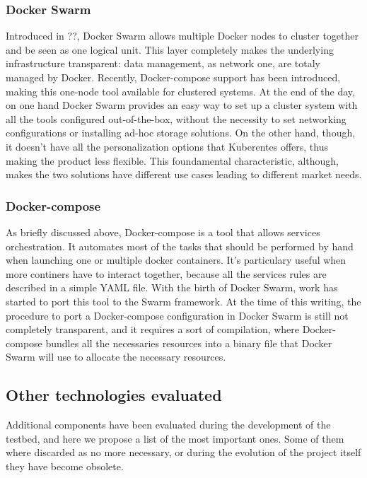 \subsubsection{Docker Swarm} Introduced in ??, Docker Swarm allows multiple Docker nodes to cluster together and be
seen as one logical unit. This layer completely makes the underlying
infrastructure transparent: data management, as network one, are totaly managed
by Docker. Recently, Docker-compose support has been introduced, making this
one-node tool available for clustered systems. At the end of the day, on one
hand Docker Swarm provides an easy way to set up a cluster system with all the
tools configured out-of-the-box, without the necessity to set networking
configurations or installing ad-hoc storage solutions. On the other hand,
though, it doesn't have all the personalization options that Kuberentes offers,
thus making the product less flexible. This foundamental characteristic,
although, makes the two solutions have different use cases leading to different
market needs. 

\subsubsection{Docker-compose} As briefly discussed above, Docker-compose is a tool
that allows services orchestration. It automates most of the tasks that should
be performed by hand when launching one or multiple docker containers. It's
particulary useful when more continers have to interact together,
because all the services rules are described in a simple YAML file. With
the birth of Docker Swarm, work has started to port this tool to the Swarm
framework. At the time of this writing, the procedure to port a Docker-compose
configuration in Docker Swarm is still not completely transparent, and it
requires a sort of compilation, where Docker-compose bundles all the necessaries
resources into a binary file that Docker Swarm will use to allocate the
necessary resources.


\subsection{Other technologies evaluated}

Additional components have been evaluated during the development of the 
testbed, and here we propose a list of the most important ones. Some of them 
where discarded as no more necessary, or during the evolution of the project 
itself they have become obsolete.

